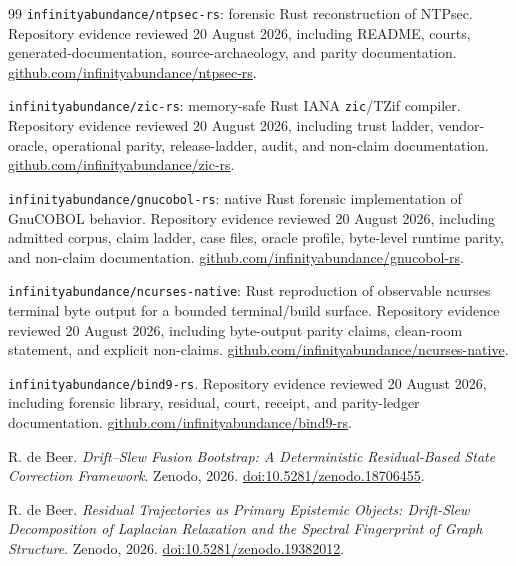 \documentclass[11pt,a4paper]{article}
\begin{document}
\begin{thebibliography}{99}
\texttt{infinityabundance/ntpsec-rs}: forensic Rust reconstruction of NTPsec.
\newblock Repository evidence reviewed 20 August 2026, including README, courts, generated-documentation, source-archaeology, and parity documentation.
\newblock \href{https://github.com/infinityabundance/ntpsec-rs}{github.com/infinityabundance/ntpsec-rs}.

\texttt{infinityabundance/zic-rs}: memory-safe Rust IANA \texttt{zic}/TZif compiler.
\newblock Repository evidence reviewed 20 August 2026, including trust ladder, vendor-oracle, operational parity, release-ladder, audit, and non-claim documentation.
\newblock \href{https://github.com/infinityabundance/zic-rs}{github.com/infinityabundance/zic-rs}.

\texttt{infinityabundance/gnucobol-rs}: native Rust forensic implementation of GnuCOBOL behavior.
\newblock Repository evidence reviewed 20 August 2026, including admitted corpus, claim ladder, case files, oracle profile, byte-level runtime parity, and non-claim documentation.
\newblock \href{https://github.com/infinityabundance/gnucobol-rs}{github.com/infinityabundance/gnucobol-rs}.

\texttt{infinityabundance/ncurses-native}: Rust reproduction of observable ncurses terminal byte output for a bounded terminal/build surface.
\newblock Repository evidence reviewed 20 August 2026, including byte-output parity claims, clean-room statement, and explicit non-claims.
\newblock \href{https://github.com/infinityabundance/ncurses-native}{github.com/infinityabundance/ncurses-native}.

\texttt{infinityabundance/bind9-rs}.
\newblock Repository evidence reviewed 20 August 2026, including forensic library, residual, court, receipt, and parity-ledger documentation.
\newblock \href{https://github.com/infinityabundance/bind9-rs}{github.com/infinityabundance/bind9-rs}.

R. de Beer.
\newblock \emph{Drift--Slew Fusion Bootstrap: A Deterministic Residual-Based State Correction Framework}.
\newblock Zenodo, 2026.
\newblock \href{https://doi.org/10.5281/zenodo.18706455}{doi:10.5281/zenodo.18706455}.

R. de Beer.
\newblock \emph{Residual Trajectories as Primary Epistemic Objects: Drift-Slew Decomposition of Laplacian Relaxation and the Spectral Fingerprint of Graph Structure}.
\newblock Zenodo, 2026.
\newblock \href{https://doi.org/10.5281/zenodo.19382012}{doi:10.5281/zenodo.19382012}.


\end{thebibliography}
\end{document}
